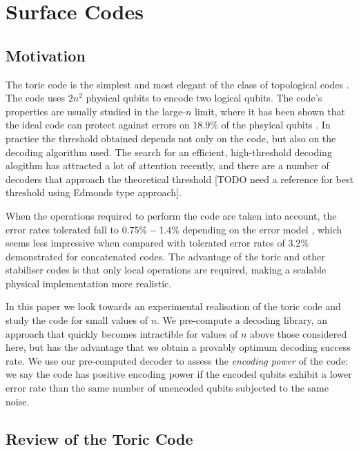 \chapter{Surface Codes} 
\label{ch:SurfaceCodes}

\section{Motivation}

The toric code is the simplest and most elegant of the class of topological codes \cite{topological_codes}. The code uses $2n^2$ physical qubits to encode two logical qubits. The code's properties are usually studied in the large-$n$ limit, where it has been shown that the ideal code can protect against errors on $18.9\%$ of the phsyical qubits \cite{bombin12}. In practice the threshold obtained depends not only on the code, but also on the decoding algorithm used. The search for an efficient, high-threshold decoding alogithm has attracted a lot of attention recently, and there are a number of decoders that approach the theoretical threshold \cite{wooton_mcmc1, poulin_renormalisation, poulin_renormalisation2} [TODO need a reference for best threshold using Edmonds type approach].

When the operations required to perform the code are taken into account, the error rates tolerated fall to $0.75\% - 1.4\%$ depending on the error model \cite{raussendorf07, fowler11, ghosh_fowler}, which seems less impressive when compared with tolerated error rates of $3.2\%$ \cite{?Knill} demonstrated for concatenated codes. The advantage of the toric and other stabiliser codes is that only local operations are required, making a scalable physical implementation more realistic.

In this paper we look towards an experimental realisation of the toric code and study the code for small values of $n$. We pre-compute a decoding library, an approach that quickly becomes intractible for values of $n$ above those considered here, but has the advantage that we obtain a provably optimum decoding success rate. We use our pre-computed decoder to assess the \textit{encoding power} of the code: we say the code has positive encoding power if the encoded qubits exhibit a lower error rate than the same number of unencoded qubits subjected to the same noise.

\section{Review of the Toric Code}

